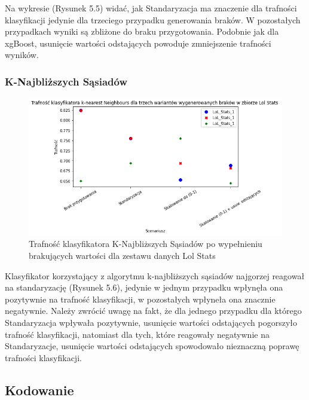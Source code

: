 \documentclass{book}
\begin{document}
    Na wykresie (Rysunek 5.5) widać, jak Standaryzacja ma znaczenie dla trafności klasyfikacji jedynie dla 
    trzeciego przypadku generowania braków. W pozostałych przypadkach wyniki są zbliżone do braku przygotowania. 
    Podobnie jak dla xgBoost, usunięcie wartości odstających powoduje zmniejszenie trafności wyników. 

\subsubsection{K-Najbliższych Sąsiadów}
    \begin{figure}[H]
    \centerline{\includegraphics[scale=0.5]{Lol_stats_knn_Standaryzacja}}
    \centering
    \caption{Trafność klasyfikatora K-Najbliższych Sąsiadów po wypełnieniu brakujących wartości dla zestawu danych Lol Stats}
    \end{figure}

    Klasyfikator korzystający z algorytmu k-najbliższych sąsiadów najgorzej reagował na standaryzację (Rysunek 5.6), 
    jedynie w jednym przypadku wpłynęła ona pozytywnie na trafność klasyfikacji, 
    w pozostałych wpłyneła ona znacznie negatywnie. Należy zwrócić uwagę na fakt, że dla jednego przypadku 
    dla którego Standaryzacja wpływała pozytywnie, usunięcie wartości odstających pogorszyło trafność klasyfikacji, natomiast dla tych, 
    które reagowały negatywnie na Standaryzacje, usunięcie wartości odstających spowodowało nieznaczną poprawę trafności klasyfikacji.


\subsection{Kodowanie}
\end{document}
